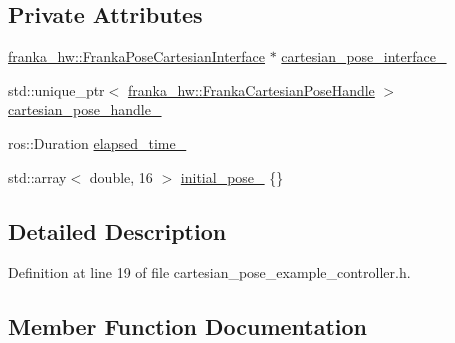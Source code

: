 \subsection*{Private Attributes}
\begin{DoxyCompactItemize}
\item 
\hyperlink{classfranka__hw_1_1FrankaPoseCartesianInterface}{franka\+\_\+hw\+::\+Franka\+Pose\+Cartesian\+Interface} $\ast$ \hyperlink{classfranka__example__controllers_1_1CartesianPoseExampleController_a19b9c7a7046c8e94d9bbd877f2e5f113}{cartesian\+\_\+pose\+\_\+interface\+\_\+}
\item 
std\+::unique\+\_\+ptr$<$ \hyperlink{classfranka__hw_1_1FrankaCartesianPoseHandle}{franka\+\_\+hw\+::\+Franka\+Cartesian\+Pose\+Handle} $>$ \hyperlink{classfranka__example__controllers_1_1CartesianPoseExampleController_a23b7a3e97178593a7ae854f6c513ede7}{cartesian\+\_\+pose\+\_\+handle\+\_\+}
\item 
ros\+::\+Duration \hyperlink{classfranka__example__controllers_1_1CartesianPoseExampleController_ab671f506567721b65a9607a216cf4a47}{elapsed\+\_\+time\+\_\+}
\item 
std\+::array$<$ double, 16 $>$ \hyperlink{classfranka__example__controllers_1_1CartesianPoseExampleController_a43c4db7364e30dbbb5fa64e6457d639e}{initial\+\_\+pose\+\_\+} \{\}
\end{DoxyCompactItemize}


\subsection{Detailed Description}


Definition at line 19 of file cartesian\+\_\+pose\+\_\+example\+\_\+controller.\+h.



\subsection{Member Function Documentation}
\mbox{\label{classfranka__example__controllers_1_1CartesianPoseExampleController_a461de40a8f5d8a76b80b25fc581e0376}} 
